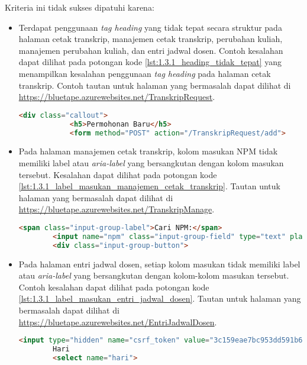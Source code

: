 Kriteria ini tidak sukses dipatuhi karena:
\begin{itemize}
    \item Terdapat penggunaan \textit{tag heading} yang tidak tepat secara struktur pada halaman cetak transkrip, manajemen cetak transkrip, perubahan kuliah, manajemen perubahan kuliah, dan entri jadwal dosen. Contoh kesalahan dapat dilihat pada potongan kode \ref{lst:1.3.1_heading_tidak_tepat} yang menampilkan kesalahan penggunaan \textit{tag heading} pada halaman cetak transkrip. Contoh tautan untuk halaman yang bermasalah dapat dilihat di \url{https://bluetape.azurewebsites.net/TranskripRequest}.
    \begin{lstlisting}[frame=single, label={lst:1.3.1_heading_tidak_tepat}, language=HTML, caption=Kriteria Sukses 1.3.1 - Penggunaan \textit{Heading} Tidak Tepat]
        <div class="callout">
            <h5>Permohonan Baru</h5>
            <form method="POST" action="/TranskripRequest/add">
    \end{lstlisting}

    \item Pada halaman manajemen cetak transkrip, kolom masukan NPM tidak memiliki label atau \textit{aria-label} yang bersangkutan dengan kolom masukan tersebut. Kesalahan dapat dilihat pada potongan kode \ref{lst:1.3.1_label_masukan_manajemen_cetak_transkrip}. Tautan untuk halaman yang bermasalah dapat dilihat di \url{https://bluetape.azurewebsites.net/TranskripManage}.
    \begin{lstlisting}[frame=single, label={lst:1.3.1_label_masukan_manajemen_cetak_transkrip}, language=HTML, caption=Kriteria Sukses 1.3.1 - Tidak Terdapat Label pada Kolom Masukan di Halaman Manajemen Cetak Transkrip]
        <span class="input-group-label">Cari NPM:</span>
        <input name="npm" class="input-group-field" type="text" placeholder="2013730013" maxlength="10" minlength="10"/>
        <div class="input-group-button">
    \end{lstlisting}

    \item Pada halaman entri jadwal dosen, setiap kolom masukan tidak memiliki label atau \textit{aria-label} yang bersangkutan dengan kolom-kolom masukan tersebut. Contoh kesalahan dapat dilihat pada potongan kode \ref{lst:1.3.1_label_masukan_entri_jadwal_dosen}. Tautan untuk halaman yang bermasalah dapat dilihat di \url{https://bluetape.azurewebsites.net/EntriJadwalDosen}.
    \begin{lstlisting}[frame=single, label={lst:1.3.1_label_masukan_entri_jadwal_dosen}, language=HTML, caption=Kriteria Sukses 1.3.1 - Tidak Terdapat Label pada Kolom Masukan di Halaman Entri Jadwal Dosen]
        <input type="hidden" name="csrf_token" value="3c159eae7bc953dd591b679c080ed066"/>
        Hari
        <select name="hari">
    \end{lstlisting}
\end{itemize} 

